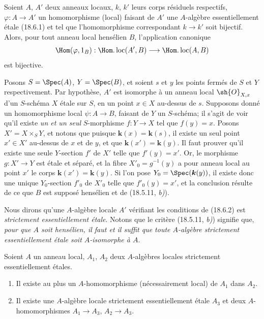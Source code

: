 \begin{lemma}[18.6.2]
Soient $A$, $A'$ deux anneaux locaux, $k$, $k'$ leurs corps résiduels respectifs, $\varphi:A\to A'$ un homomorphisme (local) faisant de $A'$ une $A$-algèbre essentiellement étale \textup{(18.6.1)} et tel que l'homomorphisme correspondant $k\to k'$ soit bijectif. Alors, pour tout anneau local \textup{hensélien} $B$, l'application canonique
\[
  \Hom(\varphi,1_B):\Hom.\operatorname{loc}(A',B)\longrightarrow\Hom.\operatorname{loc}(A,B)
\]
est bijective.
\end{lemma}

Posons $S=\Spec(A)$, $Y=\Spec(B)$, et soient $s$ et $y$ les points fermés de $S$ et $Y$ respectivement. Par hypothèse, $A'$ est isomorphe à un anneau local $\sh{O}_{X,x}$ d'un $S$-schéma $X$ étale sur $S$, en un point $x\in X$ au-dessus de $s$. Supposons donné un homomorphisme local $\psi:A\to B$, faisant de $Y$ un $S$-schéma; il s'agit de voir qu'il existe \emph{un et un seul} $S$-morphisme $f:Y\to X$ tel que $f(y)=x$. Posons $X'=X\times_S Y$, et notons que puisque $\boldsymbol{k}(x)=\boldsymbol{k}(s)$, il existe un seul point $x'\in X'$ au-dessus de $x$ et de $y$, et que $\boldsymbol{k}(x')=\boldsymbol{k}(y)$. Il faut prouver qu'il existe une seule $Y$-section $f'$ de $X'$ telle que $f'(y)=x'$. Or, le morphisme $g:X'\to Y$ est étale et séparé, et la fibre $X'_0=g^{-1}(y)$ a pour anneau local au point $x'$ le corps $\boldsymbol{k}(x')=\boldsymbol{k}(y)$. Si l'on pose $Y_0=\Spec(\boldsymbol{k}(y))$, il existe donc une unique $Y_0$-section $f'_0$ de $X'_0$ telle que $f'_0(y)=x'$, et la conclusion résulte de ce que $B$ est supposé hensélien et de (18.5.11, \emph{b)}).

Nous dirons qu'une $A$-algèbre locale $A'$ vérifiant les conditions de (18.6.2) est \emph{strictement essentiellement étale}. Notons que le critère (18.5.11, \emph{b)}) signifie que, \emph{pour que $A$ soit hensélien, il faut et il suffit que toute $A$-algèbre strictement essentiellement étale soit $A$-isomorphe à $A$}.

\begin{lemma}[18.6.3]
\label{IV.18.6.3}
Soient $A$ un anneau local, $A_1$, $A_2$ deux $A$-algèbres locales strictement essentiellement étales.
\begin{enumerate}
  \item[\textup{(i)}] Il existe au plus un $A$-homomorphisme (nécessairement local) de $A_1$ dans $A_2$.
  \item[\textup{(ii)}] Il existe une $A$-algèbre locale strictement essentiellement étale $A_3$ et deux $A$-homomorphismes $A_1\to A_3$, $A_2\to A_3$.
\end{enumerate}
\end{lemma}

